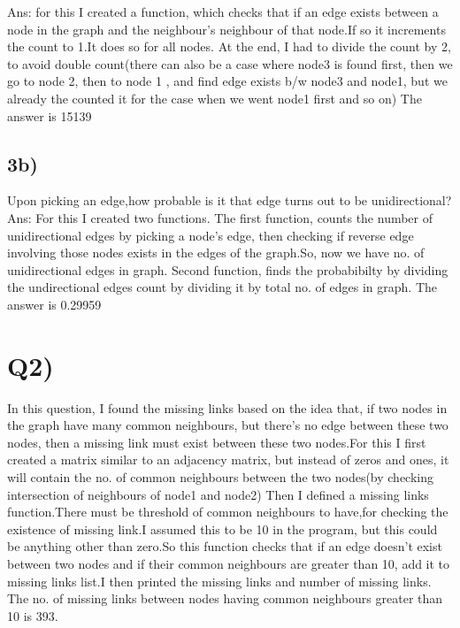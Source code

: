 \documentclass{article}
\begin{document}
Ans: for this I created a function, which checks that if an edge exists between a  node in the graph and the neighbour's neighbour of that node.If so it increments the count to 1.It does so for all nodes. At the end, I had to divide the count by 2, to avoid double count(there can also be a case where node3 is found first, then we go to node 2, then to node 1 , and find edge exists b/w node3 and node1, but we already the counted it for the case when we went node1 first and so on) The answer is 15139
\subsection*{3b)}

Upon picking an edge,how probable is it that edge turns out to be unidirectional?
Ans: For this I created two functions. The first function, counts the number of unidirectional edges by picking a node's edge, then checking if reverse edge involving those nodes exists in the edges of the graph.So, now we have no. of unidirectional edges in graph.
Second function, finds the probabibilty by dividing the undirectional edges count by dividing it by total no. of edges in graph.
The answer is 0.29959
\section*{Q2)}
In this question, I found the missing links based on the idea that, if two nodes in the graph have many common neighbours, but there's no edge between these two nodes, then a missing link must exist between these two nodes.For this I first created a matrix similar to an adjacency matrix, but instead of zeros and ones, it will contain the no. of common neighbours between the two nodes(by checking intersection of neighbours  of node1 and node2)
Then I defined a missing links function.There must be threshold of common neighbours to have,for checking the existence of missing link.I assumed this to be 10 in the program, but this could be anything other than zero.So this function checks that if an edge doesn't exist between two nodes and if their common neighbours are greater than 10, add it to missing links list.I then printed the missing links and number of missing links. 
The no. of missing links between nodes having common neighbours greater than 10 is 393.
\end{document}
